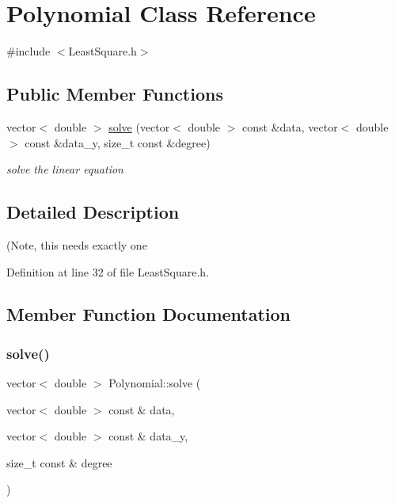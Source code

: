 \hypertarget{class_polynomial}{}\section{Polynomial Class Reference}
\label{class_polynomial}


{\ttfamily \#include $<$Least\+Square.\+h$>$}

\subsection*{Public Member Functions}
\begin{DoxyCompactItemize}
\item 
vector$<$ double $>$ \mbox{\hyperlink{class_polynomial_ae67730df0a2e45a87c9cb244fe03ad6b}{solve}} (vector$<$ double $>$ const \&data, vector$<$ double $>$ const \&data\+\_\+y, size\+\_\+t const \&degree)
\begin{DoxyCompactList}\small\item\em solve the linear equation \end{DoxyCompactList}\end{DoxyCompactItemize}


\subsection{Detailed Description}
(Note, this needs exactly one 

Definition at line 32 of file Least\+Square.\+h.



\subsection{Member Function Documentation}
\mbox{\label{class_polynomial_ae67730df0a2e45a87c9cb244fe03ad6b}} 
\subsubsection{\texorpdfstring{solve()}{solve()}}
{\footnotesize\ttfamily vector$<$ double $>$ Polynomial\+::solve (\begin{DoxyParamCaption}\item[{vector$<$ double $>$ const \&}]{data,  }\item[{vector$<$ double $>$ const \&}]{data\+\_\+y,  }\item[{size\+\_\+t const \&}]{degree }\end{DoxyParamCaption})}



